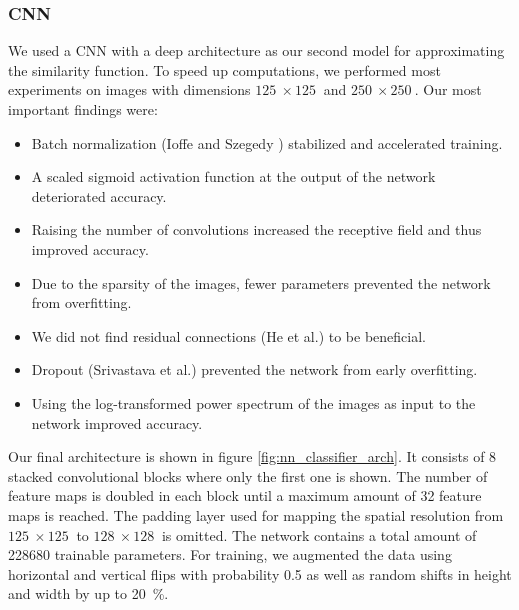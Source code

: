 \documentclass[10pt,conference,compsocconf]{IEEEtran}
\begin{document}
\subsubsection{CNN} %
We used a CNN with a deep architecture as our second model for approximating the similarity function. To speed up computations, we performed most experiments on images with dimensions $\SI{125}{}\times\SI{125}{}$ and $\SI{250}{}\times\SI{250}{}$. Our most important findings were:

\begin{itemize}
\item Batch normalization (Ioffe and Szegedy \cite{BatchNorm}) stabilized and accelerated training.
\item A scaled sigmoid activation function at the output of the network deteriorated accuracy.
\item Raising the number of convolutions increased the receptive field and thus improved accuracy.
\item Due to the sparsity of the images, fewer parameters prevented the network from overfitting.
\item We did not find residual connections (He et al.\@ \cite{ResNet}) to be beneficial.
\item Dropout (Srivastava et al.\@ \cite{Dropout}) prevented the network from early overfitting.
\item Using the log-transformed power spectrum of the images as input to the network improved accuracy.
\end{itemize}

Our final architecture is shown in figure \ref{fig:nn_classifier_arch}. It consists of 8 stacked convolutional blocks where only the first one is shown. The number of feature maps is doubled in each block until a maximum amount of \SI{32}{} feature maps is reached. The padding layer used for mapping the spatial resolution from $\SI{125}{}\times\SI{125}{}$ to $\SI{128}{}\times\SI{128}{}$ is omitted. The network contains a total amount of \SI{228680}{} trainable parameters. For training, we augmented the data using horizontal and vertical flips with probability \SI{0.5}{} as well as random shifts in height and width by up to \SI{20}{\percent}. %
\end{document}
